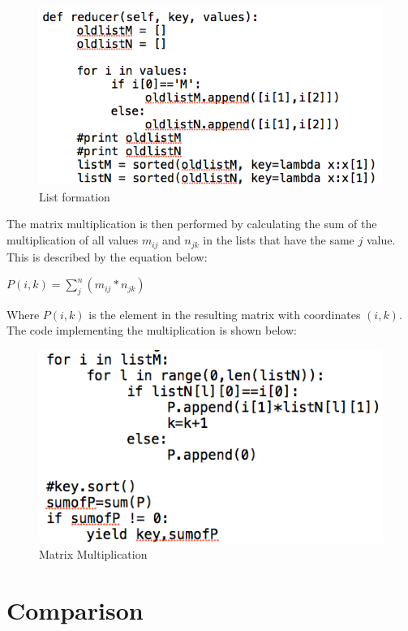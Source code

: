 \documentclass[journal, a4paper]{IEEEtran}
\begin{document}
 \begin{figure}[hbtp!]
		\centering
		\includegraphics[scale = 0.4]{listM}
		\caption{List formation}
		\label {code}
	\end{figure}
 
 
\noindent
The matrix multiplication is then performed by calculating the sum of the multiplication of all values $m_{ij}$ and $n_{jk}$ in the lists that have the same $j$ value. This is described by the equation below: 

\begin{center}
$P(i,k) =  \sum_{j}^{n}(m_{ij}*n_{jk})$\\
\end{center}

\noindent
Where $P(i,k)$ is the element in the resulting matrix with coordinates $(i,k)$.
The code implementing the multiplication is shown below:

\begin{figure}[hbtp!]
		\centering
		\includegraphics[scale = 0.4]{MM}
		\caption{Matrix Multiplication}
		\label {code}
	\end{figure}
	
	\section{Comparison}
\end{document}
